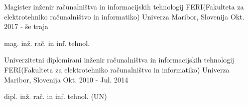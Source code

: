 

\begin{cventries}

  \cventry
    {Magister inženir računalništva in informacijskih tehnologij} %
    {FERI(Fakulteta za elektrotehniko računalništvo in informatiko)} %
    {Univerza Maribor, Slovenija} %
    {Okt. 2017 - še traja} %
    {
      \begin{cvitems} %
        \item {mag. inž. rač. in inf. tehnol.}
      \end{cvitems}
    }


\cventry
{Univerzitetni diplomirani inženir računalništva in informacijskih tehnologij} %
{FERI(Fakulteta za elektrotehniko računalništvo in informatiko)} %
{Univerza Maribor, Slovenija} %
{Okt. 2010 - Jul. 2014} %
{
  \begin{cvitems} %
    \item {dipl. inž. rač. in inf. tehnol. (UN)}
  \end{cvitems}
}


\end{cventries}
